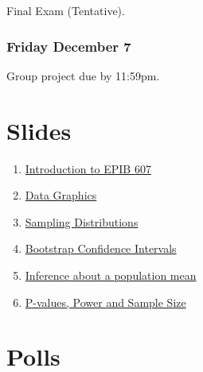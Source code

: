 \documentclass[]{book}
\providecommand{\tightlist}{%
  \setlength{\itemsep}{0pt}\setlength{\parskip}{0pt}}
\let\originaltabular\tabular
\let\endoriginaltabular\endtabular
\renewenvironment{tabular}[1]{%
  \begingroup%
  \centering%
  \originaltabular{#1}}%
  {\endoriginaltabular\endgroup}
\providecommand{\tightlist}{%
  \setlength{\itemsep}{0pt}\setlength{\parskip}{0pt}}
\theoremstyle{definition}
\theoremstyle{definition}
\theoremstyle{definition}
\theoremstyle{remark}
\begin{document}
\begin{table}[H]
\centering
\begin{tabular}{l}
\hline
Final Exam (Tentative).\\
\hline
\end{tabular}
\end{table}

\subsection{Friday December 7}\label{friday-december-7}

\begin{table}[H]
\centering
\begin{tabular}{l}
\hline
Group project due by 11:59pm.\\
\hline
\end{tabular}
\end{table}

\chapter{Slides}\label{slides}

\begin{enumerate}
\def\labelenumi{\arabic{enumi}.}
\tightlist
\item
  \href{https://docs.google.com/presentation/d/15c0YIS2KJXFzTKgFfQ_xDjTAcvPyQb8JhSLGvsEHJ6o/edit?usp=sharing}{Introduction
  to EPIB 607}
\item
  \href{https://docs.google.com/presentation/d/1wXgcTzcRKl_leGRfNZjWWPkjwJSTlZSXBCl-fFuLEaE/edit?usp=sharing}{Data
  Graphics}
\item
  \href{https://github.com/sahirbhatnagar/EPIB607/raw/master/slides/sampling_dist/EPIB607_sampling_dist.pdf}{Sampling
  Distributions}
\item
  \href{https://github.com/sahirbhatnagar/EPIB607/raw/master/slides/bootstrap/EPIB607_bootstrap.pdf}{Bootstrap
  Confidence Intervals}
\item
  \href{https://github.com/sahirbhatnagar/EPIB607/raw/master/slides/one_sample_mean/EPIB607_one_sample_mean.pdf}{Inference
  about a population mean}
\item
  \href{https://github.com/sahirbhatnagar/EPIB607/raw/master/slides/sample_size/EPIB607_sample_size.pdf}{P-values,
  Power and Sample Size}
\end{enumerate}

\chapter{Polls}\label{polls}
\end{document}
